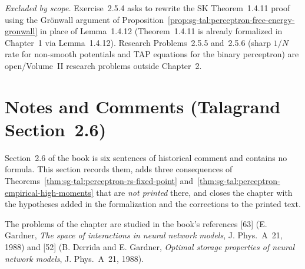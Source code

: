 \begin{remark}\label{rem:sg-tal:perceptron-sec25-problems}
\emph{Excluded by scope.} Exercise~2.5.4 asks to rewrite the SK Theorem~1.4.11 proof using the Gr\"onwall argument
of Proposition~\ref{prop:sg-tal:perceptron-free-energy-gronwall} in place of Lemma~1.4.12 (Theorem~1.4.11 is already
formalized in Chapter~1 via Lemma~1.4.12). Research Problems~2.5.5 and~2.5.6 (sharp $1/N$ rate for non-smooth
potentials and TAP equations for the binary perceptron) are open/Volume~II research problems outside Chapter~2.
\end{remark}

\section{Notes and Comments (Talagrand Section~2.6)}\label{sec:sg-tal:perceptron-notes-and-comments}

Section~2.6 of the book is six sentences of historical comment and contains no formula. This section records
them, adds three consequences of Theorems~\ref{thm:sg-tal:perceptron-rs-fixed-point}
and~\ref{thm:sg-tal:perceptron-empirical-high-moments} that are \emph{not printed} there, and closes the chapter
with the hypotheses added in the formalization and the corrections to the printed text.

\begin{remark}\label{rem:sg-tal:perceptron-notes-literature}
The problems of the chapter are studied in the book's references [63] (E. Gardner, \emph{The space of
interactions in neural network models}, J. Phys.~A~21, 1988) and [52] (B. Derrida and E. Gardner, \emph{Optimal
storage properties of neural network models}, J. Phys.~A~21, 1988).
\end{remark}

